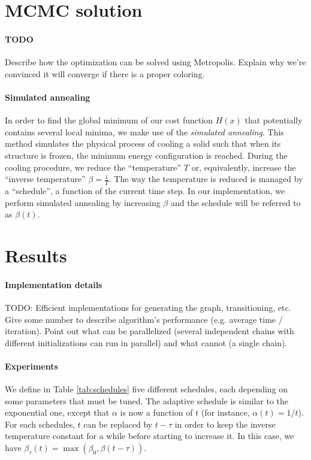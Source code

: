 \documentclass{article}
\begin{document}
  \section*{MCMC solution}
  \paragraph{TODO} Describe how the optimization can be solved using Metropolis. Explain why we're convinced it will converge if there is a proper coloring.

  \paragraph{Simulated annealing}
  In order to find the global minimum of our cost function $H(x)$ that potentially contains several local minima, we make use of the \textit{simulated annealing}. This method simulates the physical process of cooling a solid such that when its structure is frozen, the minimum energy configuration is reached. During the cooling procedure, we reduce the ``temperature'' $T$ or, equivalently, increase the ``inverse temperature'' $\beta=\frac{1}{T}$. The way the temperature is reduced is managed by a ``schedule'', a function of the current time step. In our implementation, we perform simulated annealing by increasing $\beta$ and the schedule will be referred to as $\beta(t)$.

  \section*{Results}
  \paragraph{Implementation details}
  TODO: Efficient implementations for generating the graph, transitioning, etc. Give some number to describe algorithm's performance (e.g. average time / iteration). Point out what can be parallelized (several independent chains with different initializations can run in parallel) and what cannot (a single chain).

  \paragraph{Experiments}  
  We define in Table \ref{tab:schedules} five different schedules, each depending on some parameters that must be tuned. The adaptive schedule is similar to the exponential one, except that $\alpha$ is now a function of $t$ (for instance, $\alpha(t) = 1/t$). For each schedules, $t$ can be replaced by $t-\tau$ in order to keep the inverse temperature constant for a while before starting to increase it. In this case, we have $\beta_{\tau}(t)=\max\left(\beta_0, \beta(t-\tau)\right)$.
  
\end{document}
